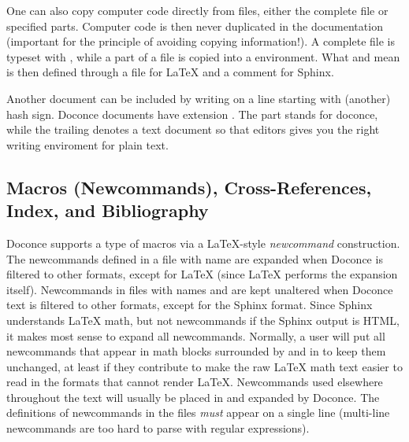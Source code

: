 \documentclass{book}
\begin{document}

One can also copy computer code directly from files, either the
complete file or specified parts.  Computer code is then never
duplicated in the documentation (important for the principle of
avoiding copying information!). A complete file is typeset
with , while a part of a file is copied into a 
environment. What  and  mean is then defined through
a  file for {\LaTeX} and a 
comment for Sphinx.

Another document can be included by writing 
on a line starting with (another) hash sign.  Doconce documents have
extension . The  part stands for doconce, while the
trailing  denotes a text document so that editors gives you the
right writing enviroment for plain text.

\subsection{Macros (Newcommands), Cross-References, Index, and Bibliography}

\label{newcommands}

Doconce supports a type of macros via a LaTeX-style \emph{newcommand}
construction.  The newcommands defined in a file with name
 are expanded when Doconce is filtered to
other formats, except for {\LaTeX} (since {\LaTeX} performs the expansion
itself).  Newcommands in files with names  and
 are kept unaltered when Doconce text is
filtered to other formats, except for the Sphinx format. Since Sphinx
understands {\LaTeX} math, but not newcommands if the Sphinx output is
HTML, it makes most sense to expand all newcommands.  Normally, a user
will put all newcommands that appear in math blocks surrounded by
 and  in  to keep them unchanged, at
least if they contribute to make the raw {\LaTeX} math text easier to
read in the formats that cannot render {\LaTeX}.  Newcommands used
elsewhere throughout the text will usually be placed in
 and expanded by Doconce.  The definitions of
newcommands in the  files \emph{must} appear on a single
line (multi-line newcommands are too hard to parse with regular
expressions).
\end{document}
